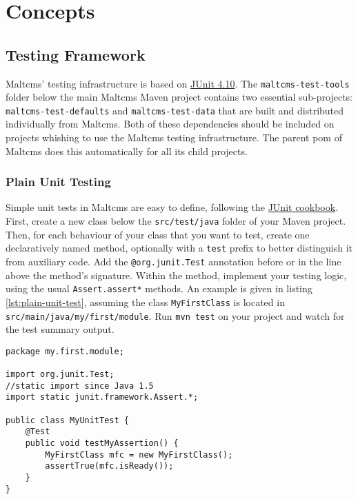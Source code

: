 \chapter{Concepts}
\section{Testing Framework}\label{sec:testing-framework}
Maltcms' testing infrastructure is based on \href{http://www.junit.org}{JUnit 4.10}. The \verb|maltcms-test-tools| folder below the main Maltcms 
Maven project contains two essential sub-projects: \verb|maltcms-test-defaults| and \verb|maltcms-test-data| that are built and distributed individually
from Maltcms. Both of these dependencies should be included on projects whishing to use the Maltcms testing infrastructure. The parent pom of Maltcms does 
this automatically for all its child projects.

\subsection{Plain Unit Testing}\label{sec:plain-unit-testing}
Simple unit tests in Maltcms are easy to define, following the \href{http://junit.sourceforge.net/doc/cookbook/cookbook.htm}{JUnit cookbook}. First,
create a new class below the \verb|src/test/java| folder of your Maven project. Then, for each behaviour of your class that you want to test, create 
one declaratively named method, optionally with a \verb|test| prefix to better distinguish it from auxiliary code. Add the \verb|@org.junit.Test| annotation
before or in the line above the method's signature. Within the method, implement your testing logic, using the usual \verb|Assert.assert*| methods. An example is given in listing \ref{lst:plain-unit-test}, assuming the class \verb|MyFirstClass| is located in \verb|src/main/java/my/first/module|.
Run \verb|mvn test| on your project and watch for the test summary output.

\begin{lstlisting}[caption={[Plain unit test]Example of a plain unit test},label=lst:plain-unit-test]
package my.first.module;

import org.junit.Test;
//static import since Java 1.5
import static junit.framework.Assert.*;

public class MyUnitTest {	
	@Test
	public void testMyAssertion() {
		MyFirstClass mfc = new MyFirstClass();
		assertTrue(mfc.isReady());
	}
}
\end{lstlisting}

